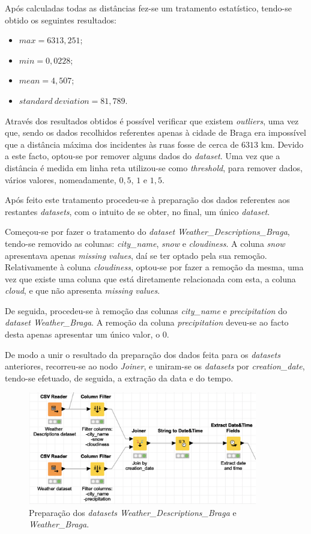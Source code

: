 \documentclass[a4paper, 12pt]{article}
\begin{document}
Após calculadas todas as distâncias fez-se um tratamento estatístico, tendo-se obtido os seguintes resultados:

\begin{itemize}
	\item ${max}= 6313,251$;
	\item ${min}= 0,0228$;
	\item ${mean}= 4,507$;
	\item ${standard \ deviation}= 81,789$.
\end{itemize}

Através dos resultados obtidos é possível verificar que existem \textit{outliers}, uma vez que, sendo os dados recolhidos referentes apenas à cidade de Braga era impossível que a distância máxima dos incidentes às ruas fosse de cerca de $6313$ km. Devido a este facto, optou-se por remover alguns dados do \textit{dataset}. Uma vez que a distância é medida em linha reta utilizou-se como \textit{threshold}, para remover dados, vários valores, nomeadamente, $0,5$, $1$ e $1,5$.

Após feito este tratamento procedeu-se à preparação dos dados referentes aos restantes \textit{datasets}, com o intuito de se obter, no final, um único \textit{dataset}.

Começou-se por fazer o tratamento do \textit{dataset Weather\_Descriptions\_Braga}, tendo-se removido as colunas: \textit{city\_name}, \textit{snow} e \textit{cloudiness}. A coluna \textit{snow} apresentava apenas \textit{missing values}, daí se ter optado pela sua remoção. Relativamente à  coluna \textit{cloudiness}, optou-se por fazer a remoção da mesma, uma vez que existe uma coluna que está diretamente relacionada com esta, a coluna \textit{cloud}, e que não apresenta \textit{missing values}.

De seguida, procedeu-se à remoção das colunas \textit{city\_name} e \textit{precipitation} do \textit{dataset Weather\_Braga}. A remoção da coluna \textit{precipitation} deveu-se ao facto desta apenas apresentar um único valor, o $0$. 

De modo a unir o resultado da preparação dos dados feita para os \textit{datasets} anteriores, recorreu-se ao nodo \textit{Joiner}, e uniram-se os \textit{datasets} por \textit{creation\_date}, tendo-se efetuado, de seguida, a extração da data e do tempo.

\begin{figure}[H]
	\centering
	\includegraphics[width=10cm]{weather}
	\caption{Preparação dos \textit{datasets Weather\_Descriptions\_Braga} e \textit{Weather\_Braga}.}
\end{figure}
\end{document}

